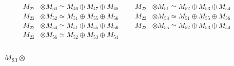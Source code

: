 \begin{align*}
M_{22} &\otimes M_{50} \simeq M_{46} \oplus M_{47} \oplus M_{48} &&& M_{22} &\otimes M_{51} \simeq M_{52} \oplus M_{53} \oplus M_{54}\\
M_{22} &\otimes M_{52} \simeq M_{51} \oplus M_{55} \oplus M_{56} &&& M_{22} &\otimes M_{53} \simeq M_{51} \oplus M_{55} \oplus M_{56}\\
M_{22} &\otimes M_{54} \simeq M_{51} \oplus M_{55} \oplus M_{56} &&& M_{22} &\otimes M_{55} \simeq M_{52} \oplus M_{53} \oplus M_{54}\\
M_{22} &\otimes M_{56} \simeq M_{52} \oplus M_{53} \oplus M_{54}
\end{align*}

\subsubsection{$ M_{23}\otimes -$}
